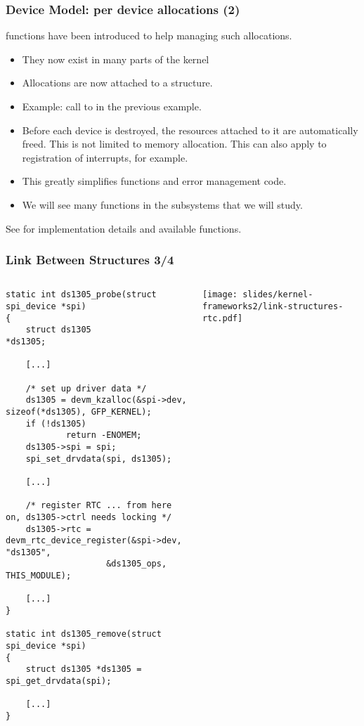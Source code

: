 \begin{frame}
  \frametitle{Device Model: per device allocations (2)}
   functions have been introduced
  to help managing such allocations.
  \begin{itemize}
  \item They now exist in many parts of the kernel
  \item Allocations are now attached to a 
	structure.
  \item Example: call to  in the
	previous example.
  \item Before each device is destroyed, the resources attached to it
        are automatically freed. This is not limited to memory
	allocation. This can also apply to registration of interrupts,
        for example.
  \item This greatly simplifies  functions and
	error management code.
  \item We will see many  functions in the subsystems
	that we will study.
  \end{itemize}
  See  for implementation details
  and available functions.
\end{frame}

\begin{frame}[fragile]
  \frametitle{Link Between Structures 3/4}
  \begin{columns}
    \begin{verbatim}
static int ds1305_probe(struct spi_device *spi)
{
    struct ds1305                   *ds1305;

    [...]

    /* set up driver data */
    ds1305 = devm_kzalloc(&spi->dev, sizeof(*ds1305), GFP_KERNEL);
    if (!ds1305)
            return -ENOMEM;
    ds1305->spi = spi;
    spi_set_drvdata(spi, ds1305);

    [...]

    /* register RTC ... from here on, ds1305->ctrl needs locking */
    ds1305->rtc = devm_rtc_device_register(&spi->dev, "ds1305",
                    &ds1305_ops, THIS_MODULE);

    [...]
}

static int ds1305_remove(struct spi_device *spi)
{
    struct ds1305 *ds1305 = spi_get_drvdata(spi);

    [...]
}
    \end{verbatim}
    \begin{center}
      \texttt{[image: slides/kernel-frameworks2/link-structures-rtc.pdf]}
    \end{center}
  \end{columns}
\end{frame}

